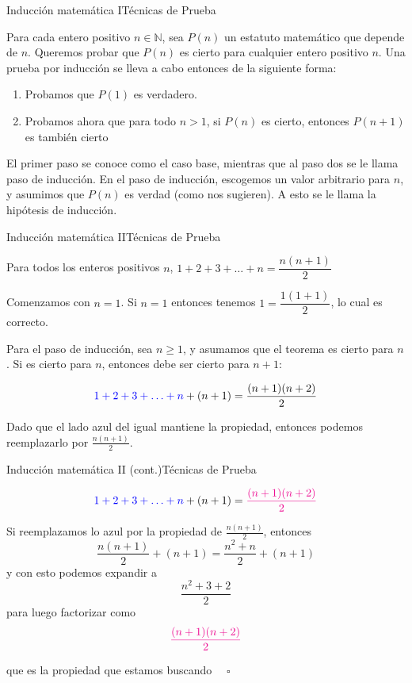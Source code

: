 \documentclass[spanish, c]{beamer}
\begin{document}
\begin{frame}{Inducción matemática I}{Técnicas de Prueba}

    Para cada entero positivo $n \in \mathbb{N}$, sea $P(n)$ un estatuto matemático que depende de $n$.
    Queremos probar que $P(n)$ es cierto para cualquier entero positivo $n$. Una prueba por \alert{inducción} se lleva a cabo entonces de la siguiente forma: \pause

    \begin{enumerate}
        \item Probamos que $P(1)$ es verdadero.\pause
        \item Probamos ahora que para todo $n > 1$, si $P(n)$ es cierto, entonces $P(n+1)$ es también cierto \pause
    \end{enumerate}

    El primer paso se conoce como el \alert{caso base}, mientras que al paso dos se le llama \alert{paso de inducción}.
    En el paso de inducción, escogemos un valor arbitrario para $n$, y asumimos que $P(n)$ es verdad (como nos sugieren). A esto se le llama \alert{la hipótesis de inducción}.
\end{frame}

\begin{frame}{Inducción matemática II}{Técnicas de Prueba}

    \begin{theorem}
        Para todos los enteros positivos $n$, $1 + 2 + 3 + \dots + n = \dfrac{n(n+1)}{2}$
    \end{theorem}

    \bigskip

    Comenzamos con $n=1$. Si $n=1$ entonces tenemos $1 = \dfrac{1(1+1)}{2}$, lo cual es correcto.
    
    Para el paso de inducción, sea $n \geq 1$, y asumamos que el teorema es cierto para $n$.
    Si es cierto para $n$, entonces debe ser cierto para $n+1$:

    $${\color{blue} 1 + 2 + 3 + \dots + n} + (n+1) = \frac{(n+1)(n+2)}{2}$$
    
    Dado que el lado azul del igual mantiene la propiedad, entonces podemos reemplazarlo por $\frac{n(n+1)}{2}$.
\end{frame}

\begin{frame}{Inducción matemática II (cont.)}{Técnicas de Prueba}

    $${\color{blue} 1 + 2 + 3 + \dots + n} + (n+1) = {\color{magenta} \frac{(n+1)(n+2)}{2}}$$

        Si reemplazamos lo azul por la propiedad de $\frac{n(n+1)}{2}$, entonces
        $$\frac{n(n+1)}{2} + (n+1) = \frac{n^2 + n}{2} + (n+1)$$
        y con esto podemos expandir a
        $$\frac{n^2 + 3 + 2}{2}$$
        para luego factorizar como
        $$\color{magenta} \frac{(n+1)(n+2)}{2}$$

        que es la propiedad que estamos buscando $\quad \square$
\end{frame}
\end{document}
